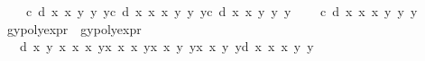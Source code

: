 \begin{isabellebody}
\ \ \ \ {\isacharplus}c{\isacharcircum}{}{\isacharasterisk}\ d{\isacharasterisk}\ x{}{\isacharcircum}{}{\isacharasterisk}\ x{}{\isacharasterisk}\ y{}{\isacharcircum}{}{\isacharasterisk}\ y{}{\isacharcircum}{}{\isacharasterisk}\ y{}{\isacharcircum}{}{\isacharminus}c{\isacharasterisk}\ d{\isacharcircum}{}{\isacharasterisk}\ x{}{\isacharasterisk}\ x{}{\isacharcircum}{}{\isacharasterisk}\ x{}{\isacharcircum}{}{\isacharasterisk}\ y{}{\isacharcircum}{}{\isacharasterisk}\ y{}{\isacharcircum}{}{\isacharasterisk}\ y{}{\isacharcircum}{}{\isacharplus}c{\isacharcircum}{}{\isacharasterisk}\ d{\isacharasterisk}\ x{}{\isacharcircum}{}{\isacharasterisk}\ x{}{\isacharcircum}{}{\isacharasterisk}\ y{}{\isacharasterisk}\ y{}{\isacharcircum}{}{\isacharasterisk}\ y{}{\isacharcircum}{}\isanewline
\ \ \ \ {\isacharminus}c{\isacharasterisk}\ d{\isacharcircum}{}{\isacharasterisk}\ x{}{\isacharcircum}{}{\isacharasterisk}\ x{}{\isacharcircum}{}{\isacharasterisk}\ x{}{\isacharcircum}{}{\isacharasterisk}\ y{}{\isacharasterisk}\ y{}{\isacharcircum}{}{\isacharasterisk}\ y{}{\isacharcircum}{}{\isacharparenright}{\isachardoublequoteclose}\isanewline
\isanewline
\ \ \isamarkupfalse%
\ gypoly{\isacharunderscore}expr\ \ {\isachardoublequoteopen}gypoly{\isacharunderscore}expr\ {\isacharequal}\ \isanewline
\ \ \ {\isacharminus}d{\isacharasterisk}\ x{}{\isacharasterisk}\ y{}{\isacharasterisk}\ {\isacharparenleft}x{}{\isacharasterisk}\ x{}{\isacharasterisk}\ x{}{\isacharasterisk}\ y{}{\isacharcircum}{}{\isacharminus}x{}{\isacharasterisk}\ x{}{\isacharasterisk}\ x{}{\isacharcircum}{}{\isacharasterisk}\ y{}{\isacharcircum}{}{\isacharplus}x{}{\isacharcircum}{}{\isacharasterisk}\ x{}{\isacharasterisk}\ y{}{\isacharasterisk}\ y{}{\isacharminus}x{}{\isacharcircum}{}{\isacharasterisk}\ x{}{\isacharcircum}{}{\isacharasterisk}\ y{}{\isacharasterisk}\ y{}{\isacharminus}d{\isacharasterisk}\ x{}{\isacharcircum}{}{\isacharasterisk}\ x{}{\isacharcircum}{}{\isacharasterisk}\ x{}{\isacharasterisk}\ y{}{\isacharcircum}{}{\isacharasterisk}\ y{}\isanewline

\end{isabellebody}
